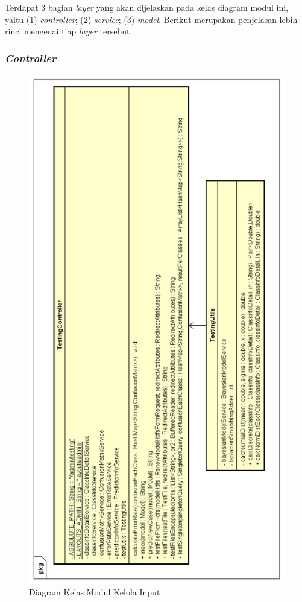 Terdapat 3 bagian \textit{layer} yang akan dijelaskan pada kelas diagram modul ini, yaitu (1) \textit{controller}; (2) \textit{service}; (3) \textit{model}. Berikut merupakan penjelasan lebih rinci mengenai tiap \textit{layer} tersebut.

\subsubsection{\textit{Controller}}
\begin{figure}[H]
	\centering
	\includegraphics[scale=0.6]{ClassDiagramLengkap/Klasifikasi/Simple_CD_Klasifikasi_Controller_Utils}
	\caption[Diagram Kelas Modul Kelola Input]{Diagram Kelas Modul Kelola Input}
	\label{fig:Diagram Kelas Modul Kelola Input}
\end{figure}

